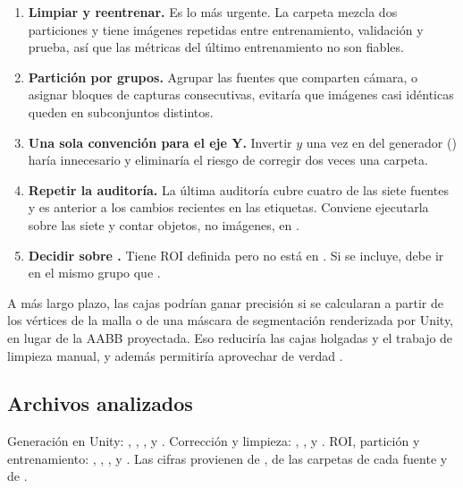 \documentclass[11pt,a4paper]{article}
\begin{document}
\begin{enumerate}[leftmargin=*]
  \item \textbf{Limpiar  y reentrenar.} Es lo más urgente. La carpeta mezcla dos particiones y tiene imágenes repetidas entre entrenamiento, validación y prueba, así que las métricas del último entrenamiento no son fiables.
  \item \textbf{Partición por grupos.} Agrupar las fuentes que comparten cámara, o asignar bloques de capturas consecutivas, evitaría que imágenes casi idénticas queden en subconjuntos distintos.
  \item \textbf{Una sola convención para el eje Y.} Invertir $y$ una vez en  del generador () haría innecesario  y eliminaría el riesgo de corregir dos veces una carpeta.
  \item \textbf{Repetir la auditoría.} La última auditoría cubre cuatro de las siete fuentes y es anterior a los cambios recientes en las etiquetas. Conviene ejecutarla sobre las siete y contar objetos, no imágenes, en .
  \item \textbf{Decidir sobre .} Tiene ROI definida pero no está en . Si se incluye, debe ir en el mismo grupo que .
\end{enumerate}

A más largo plazo, las cajas podrían ganar precisión si se calcularan a partir de los vértices de la malla o de una máscara de segmentación renderizada por Unity, en lugar de la AABB proyectada. Eso reduciría las cajas holgadas y el trabajo de limpieza manual, y además permitiría aprovechar de verdad .

\subsection*{Archivos analizados}

Generación en Unity: , , ,  y . Corrección y limpieza: , ,  y . ROI, partición y entrenamiento: , , ,  y . Las cifras provienen de , de las carpetas de cada fuente y de .
\end{document}

